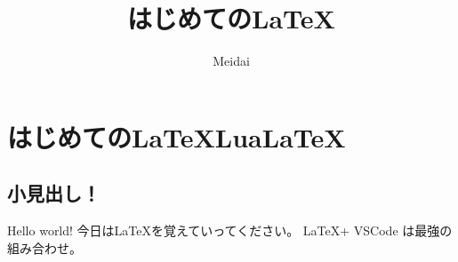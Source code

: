 \documentclass{ltjsarticle}
\begin{document}
\title{はじめての\LaTeX }
\author{Meidai}
\maketitle
  \section{はじめての\LaTeX Lua\LaTeX }
    \subsection{小見出し！}
    Hello world!
    今日は\LaTeX を覚えていってください。
    \LaTeX + VSCode は最強の組み合わせ。
\end{document}
